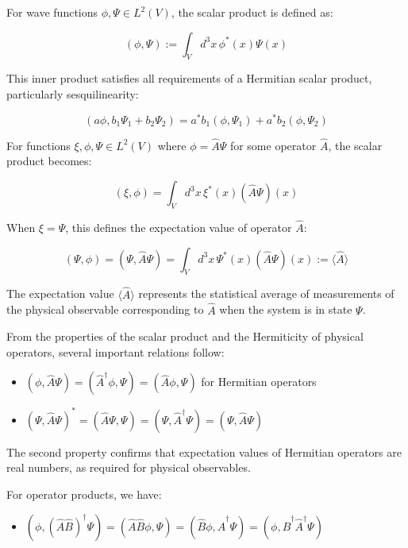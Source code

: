 For wave functions $\phi, \Psi \in L^2(V)$, the scalar product is defined as:

\begin{equation}
(\phi, \Psi) := \int_V d^3x \, \phi^*(x) \Psi(x)
\end{equation}

This inner product satisfies all requirements of a Hermitian scalar product, particularly sesquilinearity:

\begin{equation}
(a\phi, b_1\Psi_1 + b_2\Psi_2) = a^*b_1(\phi, \Psi_1) + a^*b_2(\phi, \Psi_2)
\end{equation}

For functions $\xi, \phi, \Psi \in L^2(V)$ where $\phi = \hat{A}\Psi$ for some operator $\hat{A}$, the scalar product becomes:

\begin{equation}
(\xi, \phi) = \int_V d^3x \, \xi^*(x)(\hat{A}\Psi)(x)
\end{equation}

When $\xi = \Psi$, this defines the expectation value of operator $\hat{A}$:

\begin{equation}
(\Psi, \phi) = (\Psi, \hat{A}\Psi) = \int_V d^3x \, \Psi^*(x)(\hat{A}\Psi)(x) := \langle\hat{A}\rangle
\end{equation}

The expectation value $\langle\hat{A}\rangle$ represents the statistical average of measurements of the physical observable corresponding to $\hat{A}$ when the system is in state $\Psi$.

From the properties of the scalar product and the Hermiticity of physical operators, several important relations follow:

\begin{itemize}
  \item $(\phi, \hat{A}\Psi) = (\hat{A}^\dagger\phi, \Psi) = (\hat{A}\phi, \Psi)$ for Hermitian operators
  \item $(\Psi, \hat{A}\Psi)^* = (\hat{A}\Psi, \Psi) = (\Psi, \hat{A}^\dagger\Psi) = (\Psi, \hat{A}\Psi)$
\end{itemize}

The second property confirms that expectation values of Hermitian operators are real numbers, as required for physical observables.

For operator products, we have:
\begin{itemize}
  \item $(\phi, (\hat{A}\hat{B})^\dagger\Psi) = (\hat{A}\hat{B}\phi, \Psi) = (\hat{B}\phi, \hat{A}^\dagger\Psi) = (\phi, \hat{B}^\dagger\hat{A}^\dagger\Psi)$
\end{itemize}

